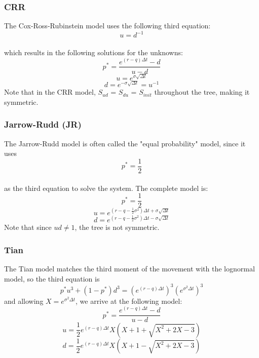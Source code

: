 \documentclass[10pt]{article}
\begin{document}
\subsubsection{CRR}
The Cox-Ross-Rubinstein model uses the following third equation:\\
    \[u = d^{-1}\] \\
which results in the following solutions for the unknowns:
    \begin{equation}
        p^{*} = \frac{e^{(r-q)\Delta t}-d}{u-d}
    \end{equation}
    \begin{equation}
        u = e^{\sigma\sqrt{\Delta t}}
    \end{equation}
    \begin{equation}
        d = e^{-\sigma\sqrt{\Delta t}} = u^{-1}
    \end{equation}
Note that in the CRR model, $S_{ud}$ = $S_{du}$ = $S_{init}$ throughout the tree, making it symmetric.

\subsubsection{Jarrow-Rudd (JR)}
The Jarrow-Rudd model is often called the "equal probability" model, since it uses\\
    \[p^{*} = \frac{1}{2}\] \\
as the third equation to solve the system. The complete model is:
    \begin{equation}
        p^{*} = \frac{1}{2}
    \end{equation}
    \begin{equation}
        u = e^{(r-q-\frac{1}{2}\sigma^{2})\Delta t+\sigma\sqrt{\Delta t}}
    \end{equation}
    \begin{equation}
        d = e^{(r-q-\frac{1}{2}\sigma^{2})\Delta t-\sigma\sqrt{\Delta t}}
    \end{equation}
Note that since $ud \neq 1$, the tree is not symmetric.

\subsubsection{Tian}
The Tian model matches the third moment of the movement with the lognormal model, so the third equation is
    \begin{equation}
        p^{*}u^{3} + (1-p^{*})d^{3} = \left(e^{(r-q)\Delta t}\right)^{3}\left(e^{\sigma^{2}\Delta t}\right)^{3}
    \end{equation}
and allowing $X = e^{\sigma^{2}\Delta t}$, we arrive at the following model:
    \begin{equation}
        p^{*} = \frac{e^{(r-q)\Delta t}-d}{u-d}
    \end{equation}
    \begin{equation}
        u = \frac{1}{2}e^{(r-q)\Delta t}X\left(X + 1 + \sqrt{X^{2}+2X-3}\right)
    \end{equation}
    \begin{equation}
        d = \frac{1}{2}e^{(r-q)\Delta t}X\left(X + 1 - \sqrt{X^{2}+2X-3}\right)
    \end{equation}
\end{document}

